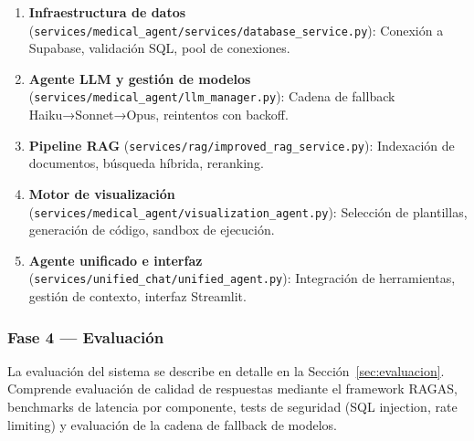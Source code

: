 \begin{enumerate}[nosep, leftmargin=*]
  \item \textbf{Infraestructura de datos} (\texttt{services/medical\_agent/services/database\_service.py}): Conexión a Supabase, validación SQL, pool de conexiones.
  \item \textbf{Agente LLM y gestión de modelos} (\texttt{services/medical\_agent/llm\_manager.py}): Cadena de fallback Haiku→Sonnet→Opus, reintentos con backoff.
  \item \textbf{Pipeline RAG} (\texttt{services/rag/improved\_rag\_service.py}): Indexación de documentos, búsqueda híbrida, reranking.
  \item \textbf{Motor de visualización} (\texttt{services/medical\_agent/visualization\_agent.py}): Selección de plantillas, generación de código, sandbox de ejecución.
  \item \textbf{Agente unificado e interfaz} (\texttt{services/unified\_chat/unified\_agent.py}): Integración de herramientas, gestión de contexto, interfaz Streamlit.
\end{enumerate}

\subsubsection{Fase 4 — Evaluación}

La evaluación del sistema se describe en detalle en la Sección~\ref{sec:evaluacion}. Comprende evaluación de calidad de respuestas mediante el framework RAGAS, benchmarks de latencia por componente, tests de seguridad (SQL injection, rate limiting) y evaluación de la cadena de fallback de modelos.

